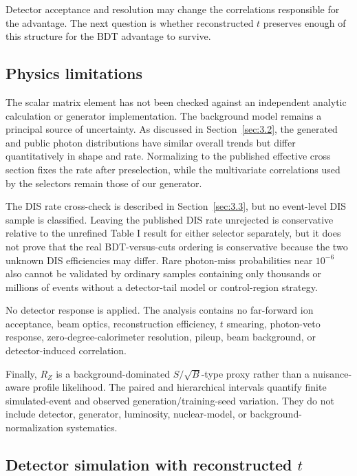 \documentclass[particles,article,submit,moreauthors,pdftex]{Definitions/mdpi}
\begin{document}
Detector acceptance and resolution may change the correlations responsible for the advantage. The next question is whether reconstructed $t$ preserves enough of this structure for the BDT advantage to survive.

\subsection{Physics limitations}\label{sec:6.2}

The scalar matrix element has not been checked against an independent analytic calculation or generator implementation. The background model remains a principal source of uncertainty. As discussed in Section~\ref{sec:3.2}, the generated and public photon distributions have similar overall trends but differ quantitatively in shape and rate. Normalizing to the published effective cross section fixes the rate after preselection, while the multivariate correlations used by the selectors remain those of our generator. 

The DIS rate cross-check is described in Section~\ref{sec:3.3}, but no event-level DIS sample is classified. Leaving the published DIS rate unrejected is conservative relative to the unrefined Table I result for either selector separately, but it does not prove that the real BDT-versus-cuts ordering is conservative because the two unknown DIS efficiencies may differ. Rare photon-miss probabilities near $10^{-6}$ also cannot be validated by ordinary samples containing only thousands or millions of events without a detector-tail model or control-region strategy.

No detector response is applied. The analysis contains no far-forward ion acceptance, beam optics, reconstruction efficiency, $t$ smearing, photon-veto response, zero-degree-calorimeter resolution, pileup, beam background, or detector-induced correlation.

Finally, $R_Z$ is a background-dominated $S/\sqrt{B}$-type proxy rather than a nuisance-aware profile likelihood. The paired and hierarchical intervals quantify finite simulated-event and observed generation/training-seed variation. They do not include detector, generator, luminosity, nuclear-model, or background-normalization systematics.

\subsection{Detector simulation with reconstructed \texorpdfstring{$t$}{t}}\label{sec:6.3}
\end{document}
